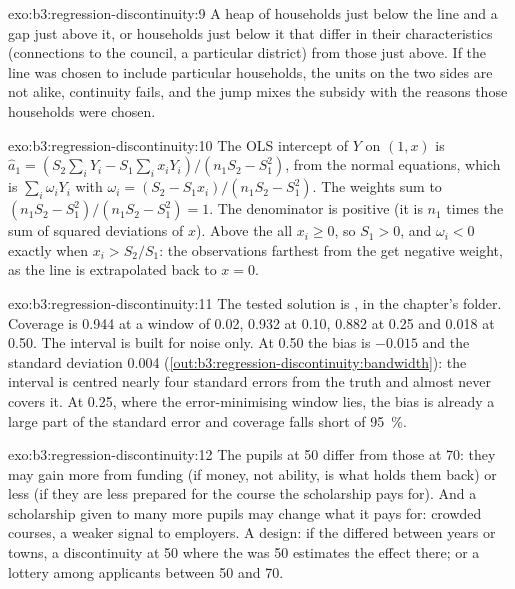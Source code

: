 \begin{solution}{exo:b3:regression-discontinuity:9}
A heap of households just below the line and a gap just above it, or households
just below it that differ in their characteristics (connections to the council,
a particular district) from those just above. If the line was chosen to include
particular households, the units on the two sides are not alike, continuity
fails, and the jump mixes the subsidy with the reasons those households were
chosen.
\end{solution}

\begin{solution}{exo:b3:regression-discontinuity:10}
The OLS intercept of $Y$ on $(1, x)$ is $\hat a_1 = (S_2 \sum_i Y_i - S_1 \sum_i
x_i Y_i)/(n_1 S_2 - S_1^2)$, from the normal equations, which is $\sum_i
\omega_i Y_i$ with $\omega_i = (S_2 - S_1 x_i)/(n_1 S_2 - S_1^2)$. The weights sum
to $(n_1 S_2 - S_1^2)/(n_1 S_2 - S_1^2) = 1$. The denominator is positive (it is
$n_1$ times the sum of squared deviations of $x$). Above the  all $x_i \ge
0$, so $S_1 > 0$, and $\omega_i < 0$ exactly when $x_i > S_2/S_1$: the
observations farthest from the  get negative weight, as the line is
extrapolated back to $x = 0$.
\end{solution}

\begin{solution}{exo:b3:regression-discontinuity:11}
The tested solution is , in the chapter's
 folder. Coverage is 0.944 at a window of 0.02, 0.932 at 0.10,
0.882 at 0.25 and 0.018 at 0.50. %
The interval is built for noise only. At 0.50 the bias is $-0.015$ and the
standard deviation 0.004 (\cref{out:b3:regression-discontinuity:bandwidth}): the
interval is centred nearly four standard errors from the truth and almost never
covers it. At 0.25, where the error-minimising window lies, the bias is already a
large part of the standard error and coverage falls short of 95~\%.
\end{solution}

\begin{solution}{exo:b3:regression-discontinuity:12}
The pupils at 50 differ from those at 70: they may gain more from funding (if
money, not ability, is what holds them back) or less (if they are less
prepared for the course the scholarship pays for). And a scholarship given to
many more pupils may change what it pays for: crowded courses, a weaker signal
to employers. A design: if the  differed between years or towns, a
discontinuity at 50 where the  was 50 estimates the effect there; or a
lottery among applicants between 50 and 70.
\end{solution}

